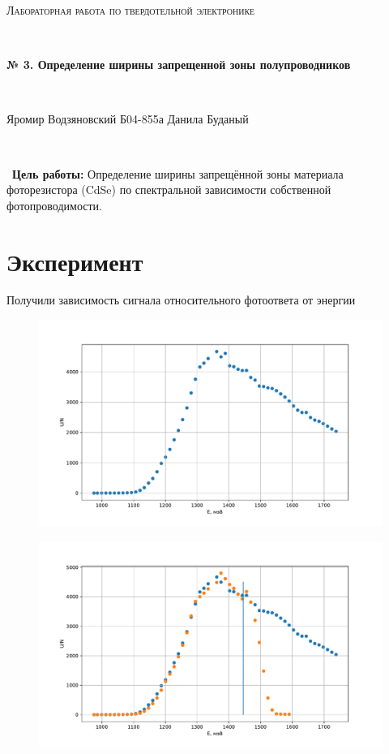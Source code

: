 \documentclass[a4paper]{article}
\begin{document}
\graphicspath{ {pictures/} }
\begin{center}
    {\scshape\Large Лабораторная работа по твердотельной электронике} \par

    \

    {\huge\bfseries № 3. Определение ширины запрещенной зоны полупроводников} \par 

    \

    {\large Яромир Водзяновский Б04-855а}
    {\large Данила Буданый}
\end{center}

\

\
\textbf{Цель работы:} Определение ширины запрещённой зоны материала фоторезистора (CdSe) по спектральной зависимости собственной фотопроводимости.

\section{Эксперимент}

Получили зависимость сигнала относительного фотоответа от энергии


\begin{figure}[H]
    \centering
    \includegraphics[scale = 0.5]{gr2.pdf}
    \caption{}
    \label{gr2}
\end{figure} 

\begin{figure}[H]
    \centering
    \includegraphics[scale = 0.5]{gr3.pdf}
    \caption{}
    \label{gr3}
\end{figure} 
\end{document}
